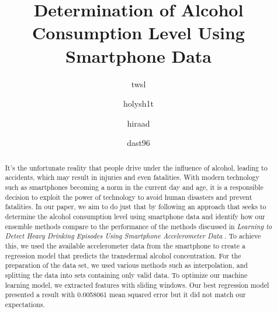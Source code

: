 \documentclass[sigconf,nonacm]{acmart}
\begin{document}
\title{Determination of Alcohol Consumption Level Using Smartphone Data}

\author{twsl}

\author{holysh1t}

\author{hiraad}

\author{dast96}

\renewcommand{\shortauthors}{twsl, holysh1t, hiraad and dast96}

\begin{abstract}
	It's the unfortunate reality that people drive under the influence of alcohol, leading to accidents, which may result in injuries and even fatalities.
	With modern technology such as smartphones becoming a norm in the current day and age, it is a responsible decision to exploit the power of technology to avoid human disasters and prevent fatalities.
	In our paper, we aim to do just that by following an approach that seeks to determine the alcohol consumption level using smartphone data and identify how our ensemble methods compare to the performance of the methods discussed in \textit{Learning to Detect Heavy Drinking Episodes Using Smartphone Accelerometer Data} \cite{DBLP:conf/ijcai/KillianPNMC19}.
	To achieve this, we used the available accelerometer data from the smartphone to create a regression model that predicts the transdermal alcohol concentration.
	For the preparation of the data set, we used various methods such as interpolation, and splitting the data into sets containing only valid data.
	To optimize our machine learning model, we extracted features with sliding windows. Our best regression model presented a result with 0.0058061 mean squared error but it did not match our expectations.
\end{abstract}
\end{document}
